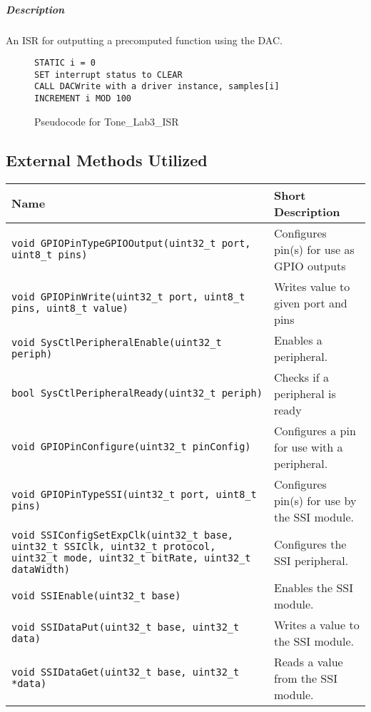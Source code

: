 \documentclass[titlepage]{article}
\begin{document}
\subparagraph{Description}
An ISR for outputting a precomputed function using the DAC.

\begin{figure}[H]
    \begin{verbatim}
STATIC i = 0
SET interrupt status to CLEAR
CALL DACWrite with a driver instance, samples[i]
INCREMENT i MOD 100
    \end{verbatim}
    \caption{Pseudocode for Tone\_Lab3\_ISR}
\end{figure}

\subsection{External Methods Utilized}
\begin{table}
    \begin{tabular}{ | p{7cm} | p{5.5cm} | }
        \hline
        \textbf{Name} & \textbf{Short Description} \\
        \hline
        \texttt{void GPIOPinTypeGPIOOutput(uint32\_t port, uint8\_t pins)} & Configures pin(s) for use as GPIO outputs \\
        \texttt{void GPIOPinWrite(uint32\_t port, uint8\_t pins, uint8\_t value)} & Writes value to given port and pins \\
        \texttt{void SysCtlPeripheralEnable(uint32\_t periph)} & Enables a peripheral. \\
        \texttt{bool SysCtlPeripheralReady(uint32\_t periph)} & Checks if a peripheral is ready \\
        \texttt{void GPIOPinConfigure(uint32\_t pinConfig)} & Configures a pin for use with a peripheral.\\
        \texttt{void GPIOPinTypeSSI(uint32\_t port, uint8\_t pins)} & Configures pin(s) for use by the SSI module. \\
        \texttt{void SSIConfigSetExpClk(uint32\_t base, uint32\_t SSIClk,
                           uint32\_t protocol, uint32\_t mode,
                           uint32\_t bitRate, uint32\_t dataWidth)} & Configures the SSI peripheral. \\
        \texttt{void SSIEnable(uint32\_t base)} & Enables the SSI module. \\
        \texttt{void SSIDataPut(uint32\_t base, uint32\_t data)} & Writes a value to the SSI module. \\
        \texttt{void SSIDataGet(uint32\_t base, uint32\_t *data)} & Reads a value from the SSI module. \\

\end{tabular}
\end{table}
\end{document}
